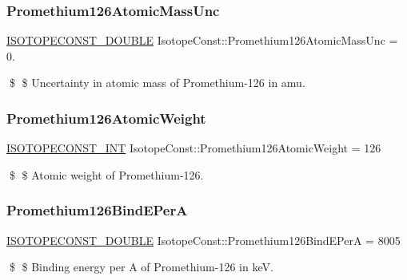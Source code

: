 \subsubsection{\texorpdfstring{Promethium126\+Atomic\+Mass\+Unc}{Promethium126AtomicMassUnc}}
{\footnotesize\ttfamily \mbox{\hyperlink{group___isotope_const-_macros_ga8f45a7272ce02c0b4c65c44636ed719a}{I\+S\+O\+T\+O\+P\+E\+C\+O\+N\+S\+T\+\_\+\+D\+O\+U\+B\+LE}} Isotope\+Const\+::\+Promethium126\+Atomic\+Mass\+Unc = 0.}

\$ \$ Uncertainty in atomic mass of Promethium-\/126 in amu. \mbox{\label{group___isotope_const-_promethium-_pm126_ga47ee8ad3a85f01111fa1ca607dab10aa}} 
\subsubsection{\texorpdfstring{Promethium126\+Atomic\+Weight}{Promethium126AtomicWeight}}
{\footnotesize\ttfamily \mbox{\hyperlink{group___isotope_const-_macros_ga5f18360b3e99483a35c32d789e62621c}{I\+S\+O\+T\+O\+P\+E\+C\+O\+N\+S\+T\+\_\+\+I\+NT}} Isotope\+Const\+::\+Promethium126\+Atomic\+Weight = 126}

\$ \$ Atomic weight of Promethium-\/126. \mbox{\label{group___isotope_const-_promethium-_pm126_ga463977d6956d48a12d77d853838f3f60}} 
\subsubsection{\texorpdfstring{Promethium126\+Bind\+E\+PerA}{Promethium126BindEPerA}}
{\footnotesize\ttfamily \mbox{\hyperlink{group___isotope_const-_macros_ga8f45a7272ce02c0b4c65c44636ed719a}{I\+S\+O\+T\+O\+P\+E\+C\+O\+N\+S\+T\+\_\+\+D\+O\+U\+B\+LE}} Isotope\+Const\+::\+Promethium126\+Bind\+E\+PerA = 8005}

\$ \$ Binding energy per A of Promethium-\/126 in keV. \mbox{\label{group___isotope_const-_promethium-_pm126_ga952ed37ff5b2f16b8f6b14ff6d071575}} 
